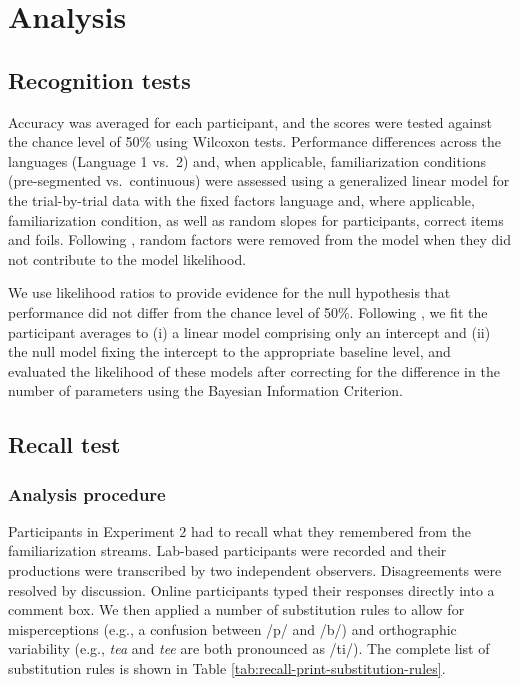 \documentclass[
]{article}
\begin{document}
\section{Analysis}\label{analysis}

\subsection{Recognition tests}\label{recognition-tests}

Accuracy was averaged for each participant, and the scores were tested
against the chance level of 50\% using Wilcoxon tests. Performance
differences across the languages (Language 1 vs.~2) and, when
applicable, familiarization conditions (pre-segmented vs.~continuous)
were assessed using a generalized linear model for the trial-by-trial
data with the fixed factors language and, where applicable,
familiarization condition, as well as random slopes for participants,
correct items and foils. Following \citep{Baayen2008}, random factors
were removed from the model when they did not contribute to the model
likelihood.

We use likelihood ratios to provide evidence for the null hypothesis
that performance did not differ from the chance level of 50\%. Following
\citep{Glover2004}, we fit the participant averages to (i) a linear
model comprising only an intercept and (ii) the null model fixing the
intercept to the appropriate baseline level, and evaluated the
likelihood of these models after correcting for the difference in the
number of parameters using the Bayesian Information Criterion.

\subsection{Recall test}\label{recall-test-1}

\subsubsection{Analysis procedure}\label{analysis-procedure}

Participants in Experiment 2 had to recall what they remembered from the
familiarization streams. Lab-based participants were recorded and their
productions were transcribed by two independent observers. Disagreements
were resolved by discussion. Online participants typed their responses
directly into a comment box. We then applied a number of substitution
rules to allow for misperceptions (e.g., a confusion between /p/ and
/b/) and orthographic variability (e.g., \emph{tea} and \emph{tee} are
both pronounced as /ti/). The complete list of substitution rules is
shown in Table \ref{tab:recall-print-substitution-rules}.
\end{document}
